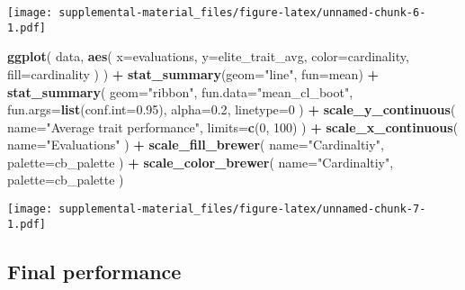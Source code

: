 \documentclass[]{book}
\newenvironment{Shaded}{\begin{snugshade}}{\end{snugshade}}
\newcommand{\DataTypeTok}[1]{\textcolor[rgb]{0.13,0.29,0.53}{#1}}
\newcommand{\DecValTok}[1]{\textcolor[rgb]{0.00,0.00,0.81}{#1}}
\newcommand{\FloatTok}[1]{\textcolor[rgb]{0.00,0.00,0.81}{#1}}
\newcommand{\KeywordTok}[1]{\textcolor[rgb]{0.13,0.29,0.53}{\textbf{#1}}}
\newcommand{\NormalTok}[1]{#1}
\newcommand{\OperatorTok}[1]{\textcolor[rgb]{0.81,0.36,0.00}{\textbf{#1}}}
\newcommand{\StringTok}[1]{\textcolor[rgb]{0.31,0.60,0.02}{#1}}
\begin{document}
\texttt{[image: supplemental-material\_files/figure-latex/unnamed-chunk-6-1.pdf]}

\begin{Shaded}
\begin{Highlighting}[]
\KeywordTok{ggplot}\NormalTok{(}
\NormalTok{    data,}
    \KeywordTok{aes}\NormalTok{(}
      \DataTypeTok{x=}\NormalTok{evaluations,}
      \DataTypeTok{y=}\NormalTok{elite_trait_avg,}
      \DataTypeTok{color=}\NormalTok{cardinality,}
      \DataTypeTok{fill=}\NormalTok{cardinality}
\NormalTok{    )}
\NormalTok{  ) }\OperatorTok{+}
\StringTok{  }\KeywordTok{stat_summary}\NormalTok{(}\DataTypeTok{geom=}\StringTok{"line"}\NormalTok{, }\DataTypeTok{fun=}\NormalTok{mean) }\OperatorTok{+}
\StringTok{  }\KeywordTok{stat_summary}\NormalTok{(}
    \DataTypeTok{geom=}\StringTok{"ribbon"}\NormalTok{,}
    \DataTypeTok{fun.data=}\StringTok{"mean_cl_boot"}\NormalTok{,}
    \DataTypeTok{fun.args=}\KeywordTok{list}\NormalTok{(}\DataTypeTok{conf.int=}\FloatTok{0.95}\NormalTok{),}
    \DataTypeTok{alpha=}\FloatTok{0.2}\NormalTok{,}
    \DataTypeTok{linetype=}\DecValTok{0}
\NormalTok{  ) }\OperatorTok{+}
\StringTok{  }\KeywordTok{scale_y_continuous}\NormalTok{(}
    \DataTypeTok{name=}\StringTok{"Average trait performance"}\NormalTok{,}
    \DataTypeTok{limits=}\KeywordTok{c}\NormalTok{(}\DecValTok{0}\NormalTok{, }\DecValTok{100}\NormalTok{)}
\NormalTok{  ) }\OperatorTok{+}
\StringTok{  }\KeywordTok{scale_x_continuous}\NormalTok{(}
    \DataTypeTok{name=}\StringTok{"Evaluations"}
\NormalTok{  ) }\OperatorTok{+}
\StringTok{  }\KeywordTok{scale_fill_brewer}\NormalTok{(}
    \DataTypeTok{name=}\StringTok{"Cardinaltiy"}\NormalTok{,}
    \DataTypeTok{palette=}\NormalTok{cb_palette}
\NormalTok{  ) }\OperatorTok{+}
\StringTok{  }\KeywordTok{scale_color_brewer}\NormalTok{(}
    \DataTypeTok{name=}\StringTok{"Cardinaltiy"}\NormalTok{,}
    \DataTypeTok{palette=}\NormalTok{cb_palette}
\NormalTok{  )}
\end{Highlighting}
\end{Shaded}

\texttt{[image: supplemental-material\_files/figure-latex/unnamed-chunk-7-1.pdf]}

\hypertarget{final-performance}{%
\subsection{Final performance}\label{final-performance}}
\end{document}
